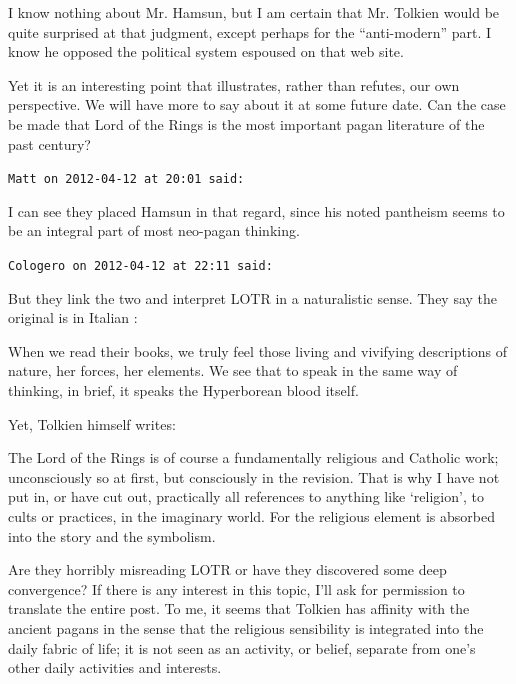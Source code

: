 \begin{footnotesize}
\begin{sffamily}
I know nothing about Mr. Hamsun, but I am certain that Mr. Tolkien would be quite surprised at that judgment, except perhaps for the ``anti-modern'' part. I know he opposed the political system espoused on that web site.

Yet it is an interesting point that illustrates, rather than refutes, our own perspective. We will have more to say about it at some future date. Can the case be made that Lord of the Rings is the most important pagan literature of the past century?

\hfill

\texttt{Matt on 2012-04-12 at 20:01 said:}

I can see they placed Hamsun in that regard, since his noted pantheism seems to be an integral part of most neo-pagan thinking.

\hfill

\texttt{Cologero on 2012-04-12 at 22:11 said:}

But they link the two and interpret LOTR in a naturalistic sense. They say the original is in Italian :

\begin{quotex}\footnotesize

When we read their books, we truly feel those living and vivifying descriptions of nature, her forces, her elements. We see that to speak in the same way of thinking, in brief, it speaks the Hyperborean blood itself.
\end{quotex}


Yet, Tolkien himself writes:

\begin{quotex}\footnotesize

The Lord of the Rings is of course a fundamentally religious and Catholic work; unconsciously so at first, but consciously in the revision. That is why I have not put in, or have cut out, practically all references to anything like `religion', to cults or practices, in the imaginary world. For the religious element is absorbed into the story and the symbolism.
\end{quotex}


Are they horribly misreading LOTR or have they discovered some deep convergence? If there is any interest in this topic, I'll ask for permission to translate the entire post. To me, it seems that Tolkien has affinity with the ancient pagans in the sense that the religious sensibility is integrated into the daily fabric of life; it is not seen as an activity, or belief, separate from one's other daily activities and interests.


\end{sffamily}
\end{footnotesize}

